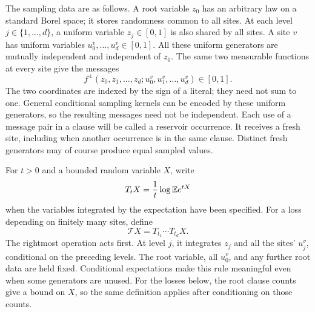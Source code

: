 The sampling data are as follows.  A root variable $z_0$ has an arbitrary
law on a standard Borel space; it stores randomness common to all sites.
At each level $j\in\{1,\ldots,d\}$, a uniform variable $z_j\in[0,1]$ is
also shared by all sites.  A site $v$ has uniform variables
$u_0^v,\ldots,u_d^v\in[0,1]$.  All these uniform generators are mutually
independent and independent of $z_0$.  The same two measurable functions
at every site give the messages
\begin{equation}
 f^\pm(z_0,z_1,\ldots,z_d;u_0^v,u_1^v,\ldots,u_d^v)\in[0,1].
 \label{ctr:messages}
\end{equation}
The two coordinates are indexed by the sign of a literal; they need not
sum to one.  General conditional sampling kernels can be encoded by these
uniform generators, so the resulting messages need not be independent.
Each use of a message pair in a clause will be called a reservoir occurrence.
It receives a fresh site, including when another occurrence is in the same
clause.  Distinct fresh generators may of course produce equal sampled values.

For $t>0$ and a bounded random variable $X$, write
\[
 T_tX=\frac1t\log\mathbb E e^{tX}
\]
when the variables integrated by the expectation have been specified.
For a loss depending on finitely many sites, define
\begin{equation}
 \mathcal TX=T_{t_1}\cdots T_{t_d}X.
 \label{ctr:transform}
\end{equation}
The rightmost operation acts first.  At level $j$, it integrates $z_j$ and
all the sites' $u_j^v$, conditional on the preceding levels.  The root
variable, all $u_0^v$, and any further root data are held fixed.  Conditional
expectations make this rule meaningful even when some generators are unused.
For the losses below, the root clause counts give a bound on $X$, so the
same definition applies after conditioning on those counts.

